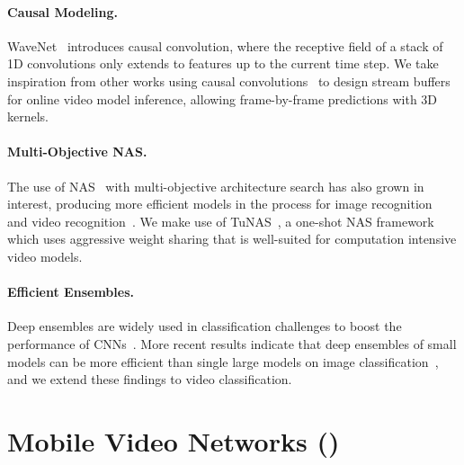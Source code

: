 \documentclass[final]{cvpr}
\begin{document}
\vspace{-12pt}
\paragraph{Causal Modeling.}
WaveNet~\cite{oord2016wavenet} introduces causal convolution, where the receptive field of a stack of 1D convolutions only extends to features up to the current time step.
We take inspiration from other works using causal convolutions~\cite{carreira2018massively,chang2018temporal,dai2019transformer,cheng2019sparse,daiya2020stock} to design stream buffers for online video model inference, allowing frame-by-frame predictions with 3D kernels.


\vspace{-12pt}
\paragraph{Multi-Objective NAS.}
The use of NAS~\cite{zoph2016neural,liu2018progressive,pham2018efficient,tan2019mnasnet,cai2018proxylessnas,kandasamy2018neural} with multi-objective architecture search has also grown in interest, producing more efficient models in the process for image recognition~\cite{tan2019mnasnet, cai2018proxylessnas, bender2020can} and video recognition~\cite{piergiovanni2020tiny, ryoo2019assemblenet}.
We make use of TuNAS~\cite{bender2020can}, a one-shot NAS framework which uses aggressive weight sharing that is well-suited for computation intensive video models.

\vspace{-12pt}
\paragraph{Efficient Ensembles.}
Deep ensembles are widely used in classification challenges to boost the performance of CNNs~\cite{bian2017revisiting,simonyan2014very,Szegedy_2015_CVPR,he2016deep}.
More recent results indicate that deep ensembles of small models can be more efficient than single large models on image classification~\cite{kondratyuk2020ensembling,lobacheva2020power,NIPS2016_c51ce410, NIPS2016_20d135f0,furlanello2018born}, and we extend these findings to video classification.
 
\section{Mobile Video Networks (\ournets)} \label{sec:approach}
\end{document}
